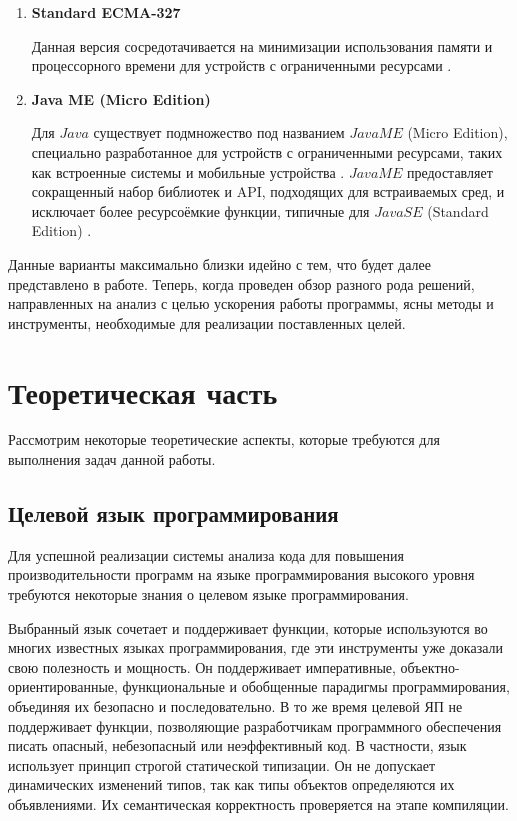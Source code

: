 \documentclass{mipt-thesis-bs}
\begin{document}
\begin{enumerate}
        \item \textbf{Standard ECMA-327}

        Данная версия сосредотачивается на минимизации использования памяти и
        процессорного времени для устройств с ограниченными ресурсами \cite{ecma-327}.

        \item \textbf{Java ME (Micro Edition)}

        Для $Java$ существует подмножество под названием $Java ME$ (Micro Edition),
        специально разработанное для устройств с ограниченными ресурсами, таких
        как встроенные системы и мобильные устройства \cite{java-me}. $Java ME$ предоставляет
        сокращенный набор библиотек и API, подходящих для встраиваемых сред,
        и исключает более ресурсоёмкие функции, типичные для $Java SE$ (Standard Edition) \cite{java-se}.
\end{enumerate}

Данные варианты максимально близки идейно с тем, что будет далее представлено в работе.
Теперь, когда проведен обзор разного рода решений, направленных на анализ с целью ускорения
работы программы, ясны методы и инструменты, необходимые для реализации поставленных целей.


\chapter{Теоретическая часть}

Рассмотрим некоторые теоретические аспекты, которые требуются для
выполнения задач данной работы.

\section{Целевой язык программирования}

Для успешной реализации системы анализа кода для повышения производительности программ на
языке программирования высокого уровня требуются некоторые знания о целевом языке программирования.

Выбранный язык сочетает и поддерживает функции, которые используются во многих известных
языках программирования, где эти инструменты уже доказали свою полезность и мощность.
Он поддерживает императивные, объектно-ориентированные, функциональные и обобщенные
 парадигмы программирования, объединяя их безопасно и последовательно.
В то же время целевой ЯП не поддерживает функции, позволяющие разработчикам
программного обеспечения писать опасный, небезопасный или неэффективный код.
В частности, язык использует принцип строгой статической типизации. Он не допускает
динамических изменений типов, так как типы объектов определяются их объявлениями.
Их семантическая корректность проверяется на этапе компиляции.
\end{document}
